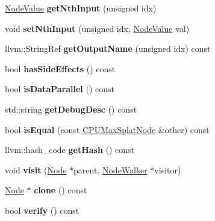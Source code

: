 \begin{DoxyCompactItemize}
\item 
\mbox{\label{classglow_1_1_c_p_u_max_splat_node_acb1929e9b808c2a83e07acd857641bfe}} 
\hyperlink{structglow_1_1_node_value}{Node\+Value} {\bfseries get\+Nth\+Input} (unsigned idx)
\item 
\mbox{\label{classglow_1_1_c_p_u_max_splat_node_abcfb16a7c39e5125a0fc8875e792ea6e}} 
void {\bfseries set\+Nth\+Input} (unsigned idx, \hyperlink{structglow_1_1_node_value}{Node\+Value} val)
\item 
\mbox{\label{classglow_1_1_c_p_u_max_splat_node_ab91801d425c2df49b2db7ab7c11a776b}} 
llvm\+::\+String\+Ref {\bfseries get\+Output\+Name} (unsigned idx) const
\item 
\mbox{\label{classglow_1_1_c_p_u_max_splat_node_a41e402d737e4a286c7cf7655e6730fea}} 
bool {\bfseries has\+Side\+Effects} () const
\item 
\mbox{\label{classglow_1_1_c_p_u_max_splat_node_ad913a2370bc95b70aafa339c374e2d6b}} 
bool {\bfseries is\+Data\+Parallel} () const
\item 
\mbox{\label{classglow_1_1_c_p_u_max_splat_node_afc528fc5825da502f040bae5814509bc}} 
std\+::string {\bfseries get\+Debug\+Desc} () const
\item 
\mbox{\label{classglow_1_1_c_p_u_max_splat_node_a27fff34ac14615f0b417512198dd565b}} 
bool {\bfseries is\+Equal} (const \hyperlink{classglow_1_1_c_p_u_max_splat_node}{C\+P\+U\+Max\+Splat\+Node} \&other) const
\item 
\mbox{\label{classglow_1_1_c_p_u_max_splat_node_aa04379934693630ca68e4d9285c0e510}} 
llvm\+::hash\+\_\+code {\bfseries get\+Hash} () const
\item 
\mbox{\label{classglow_1_1_c_p_u_max_splat_node_a0c58ac90d4baf49e081c4fed7932abda}} 
void {\bfseries visit} (\hyperlink{classglow_1_1_node}{Node} $\ast$parent, \hyperlink{classglow_1_1_node_walker}{Node\+Walker} $\ast$visitor)
\item 
\mbox{\label{classglow_1_1_c_p_u_max_splat_node_a8d76c8a3d3ceb204b7e44456698c4722}} 
\hyperlink{classglow_1_1_node}{Node} $\ast$ {\bfseries clone} () const
\item 
\mbox{\label{classglow_1_1_c_p_u_max_splat_node_a581002990f6ada6b1cb3379321db23ec}} 
bool {\bfseries verify} () const
\end{DoxyCompactItemize}
